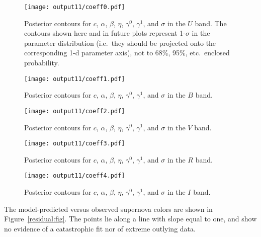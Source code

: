 \documentclass{aastex61}   	%
\begin{document}
\begin{figure}[htbp] %
   \centering
   \texttt{[image: output11/coeff0.pdf]} 
            \caption{Posterior contours for $c$, $\alpha$, $\beta$, $\eta$, $\gamma^0$, $\gamma^1$, and $\sigma$ in the $U$ band.
            The contours shown here and in future plots represent 1-$\sigma$ in the parameter distribution (i.e.\ they should be
            projected onto the corresponding 1-d parameter axis), not to 68\%, 95\%, etc.\
            enclosed probability.  \label{global1:fig}}
\end{figure}

\begin{figure}[htbp] %
   \centering
   \texttt{[image: output11/coeff1.pdf]} 
            \caption{Posterior contours for $c$, $\alpha$, $\beta$, $\eta$, $\gamma^0$, $\gamma^1$, and $\sigma$ in the $B$ band.
 \label{global2:fig}}
\end{figure}

\begin{figure}[htbp] %
   \centering
   \texttt{[image: output11/coeff2.pdf]} 
            \caption{Posterior contours for $c$, $\alpha$, $\beta$, $\eta$, $\gamma^0$, $\gamma^1$, and $\sigma$ in the $V$ band.
 \label{global3:fig}}
\end{figure}

\begin{figure}[htbp] %
   \centering
      \texttt{[image: output11/coeff3.pdf]} 
            \caption{Posterior contours for $c$, $\alpha$, $\beta$, $\eta$, $\gamma^0$, $\gamma^1$, and $\sigma$ in the $R$ band.
 \label{global4:fig}}
\end{figure}

\begin{figure}[htbp] %
   \centering
         \texttt{[image: output11/coeff4.pdf]} 
            \caption{Posterior contours for $c$, $\alpha$, $\beta$, $\eta$, $\gamma^0$, $\gamma^1$, and $\sigma$ in the $I$ band.
 \label{global5:fig}}
\end{figure}


The model-predicted versus observed supernova colors are shown in Figure~\ref{residual:fig}.
The points lie along a line with slope equal to one, and show no evidence of a catastrophic fit nor of extreme
outlying data.
\end{document}

